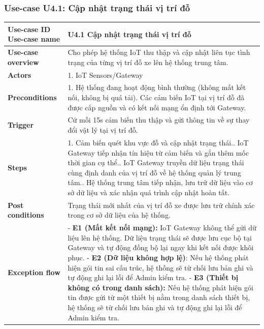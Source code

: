 \subsubsection{Use-case U4.1: Cập nhật trạng thái vị trí đỗ}
\vspace{0.5cm}
\noindent
\begin{tabularx}{\textwidth}{|>{\raggedright\arraybackslash}p{4cm}|X|}
\hline
\textbf{Use-case ID} \newline \textbf{Use-case name} & U4.1 \newline \textbf{Cập nhật trạng thái vị trí đỗ} \\ \hline
\textbf{Use-case overview} & Cho phép hệ thống IoT thu thập và cập nhật liên tục tình trạng của từng vị trí đỗ xe lên hệ thống trung tâm. \\ \hline
\textbf{Actors} & 1. IoT Sensors/Gateway \\ \hline
\textbf{Preconditions} & 
1. Hệ thống đang hoạt động bình thường (không mất kết nối, không bị quá tải)\newline
2. Các cảm biến IoT tại vị trí đỗ đã được cấp nguồn và có kết nối mạng ổn định tới Gateway. \\ \hline
\textbf{Trigger} & Cứ mỗi 15s cảm biến thu thập và gửi thông tin về sự thay đổi vật lý tại vị trí đỗ. \\ \hline
\textbf{Steps} & 
1. Cảm biến quét khu vực đỗ và cập nhật trạng thái.\newline
2. IoT Gateway tiếp nhận tín hiệu từ cảm biến và gắn thêm mốc thời gian cụ thể.\newline
3. IoT Gateway truyền dữ liệu trạng thái cùng định danh của vị trí đỗ về hệ thống quản lý trung tâm.\newline
4. Hệ thống trung tâm tiếp nhận, lưu trữ dữ liệu vào cơ sở dữ liệu và xác nhận quá trình cập nhật hoàn tất. \\ \hline
\textbf{Post conditions} & Trạng thái mới nhất của vị trí đỗ xe được lưu trữ chính xác trong cơ sở dữ liệu của hệ thống. \\ \hline
\textbf{Exception flow} & 
- \textbf{E1 (Mất kết nối mạng):} IoT Gateway không thể gửi dữ liệu lên hệ thống. Dữ liệu trạng thái sẽ được lưu cục bộ tại Gateway và tự động đồng bộ lại ngay khi kết nối được khôi phục. \newline 
- \textbf{E2 (Dữ liệu không hợp lệ)}: Nếu hệ thống phát hiện gói tin sai cấu trúc, hệ thống sẽ từ chối lưu bản ghi và tự động ghi lại lỗi để Admin kiểm tra. \newline 
- \textbf{E3 (Thiết bị không có trong danh sách):} Nếu hệ thống phát hiện gói tin được gửi từ một thiết bị nằm trong danh sách thiết bị, hệ thống sẽ từ chối lưu bản ghi và tự động ghi lại lỗi để Admin kiểm tra. \\ \hline
\end{tabularx}
\newpage

